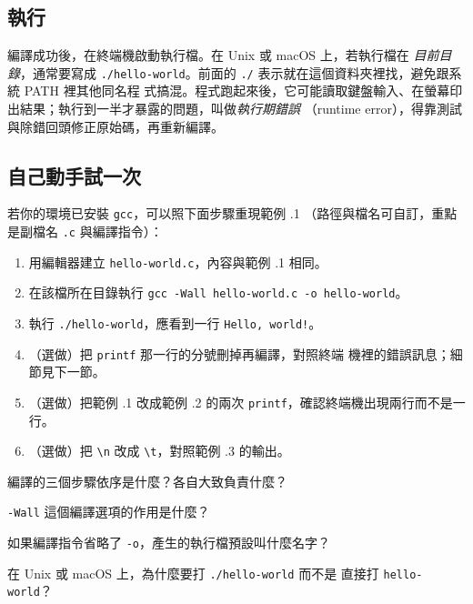 
\subsection{執行}

編譯成功後，在終端機啟動執行檔。在 Unix 或 macOS 上，若執行檔在
\emph{目前目錄}，通常要寫成 \texttt{./hello-world}。前面的
\texttt{./} 表示就在這個資料夾裡找，避免跟系統 PATH 裡其他同名程
式搞混。程式跑起來後，它可能讀取鍵盤輸入、在螢幕印出結果；執行到一半才暴露的問題，叫做\emph{執行期錯誤}
（runtime error），得靠測試與除錯回頭修正原始碼，再重新編譯。

\subsection{自己動手試一次}

若你的環境已安裝 \texttt{gcc}，可以照下面步驟重現範例 \thechapter.1
（路徑與檔名可自訂，重點是副檔名 \texttt{.c} 與編譯指令）：

\begin{enumerate}
    \item 用編輯器建立 \texttt{hello-world.c}，內容與範例
          \thechapter.1 相同。
    \item 在該檔所在目錄執行
          \texttt{gcc -Wall hello-world.c -o hello-world}。
    \item 執行 \texttt{./hello-world}，應看到一行
          \texttt{Hello, world!}。
    \item （選做）把 \texttt{printf} 那一行的分號刪掉再編譯，對照終端
          機裡的錯誤訊息；細節見下一節。
    \item （選做）把範例 \thechapter.1 改成範例 \thechapter.2 的兩次
          \texttt{printf}，確認終端機出現兩行而不是一行。
    \item （選做）把 \texttt{\textbackslash n} 改成
          \texttt{\textbackslash t}，對照範例 \thechapter.3 的輸出。
\end{enumerate}

\begin{drills}[label=drills:intro-build-pipeline]
\item 編譯的三個步驟依序是什麼？各自大致負責什麼？
\item \texttt{-Wall} 這個編譯選項的作用是什麼？
\item 如果編譯指令省略了 \texttt{-o}，產生的執行檔預設叫什麼名字？
\item 在 Unix 或 macOS 上，為什麼要打 \texttt{./hello-world} 而不是
直接打 \texttt{hello-world}？
\end{drills}

